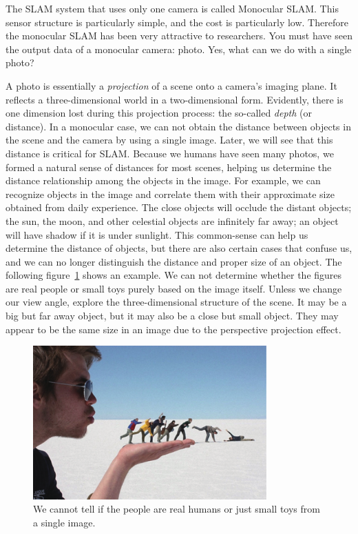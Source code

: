 The SLAM system that uses only one camera is called Monocular SLAM. This sensor structure is particularly simple, and the cost is particularly low. Therefore the monocular SLAM has been very attractive to researchers. You must have seen the output data of a monocular camera: photo. Yes, what can we do with a single photo?

A photo is essentially a \textit{projection} of a scene onto a camera's imaging plane. It reflects a three-dimensional world in a two-dimensional form. Evidently, there is one dimension lost during this projection process: the so-called \textit{depth} (or distance). In a monocular case, we can not obtain the distance between objects in the scene and the camera by using a single image. Later, we will see that this distance is critical for SLAM. Because we humans have seen many photos, we formed a natural sense of distances for most scenes, helping us determine the distance relationship among the objects in the image. For example, we can recognize objects in the image and correlate them with their approximate size obtained from daily experience. The close objects will occlude the distant objects; the sun, the moon, and other celestial objects are infinitely far away; an object will have shadow if it is under sunlight. This common-sense can help us determine the distance of objects, but there are also certain cases that confuse us, and we can no longer distinguish the distance and proper size of an object. The following figure~\ref{fig:why-depth} shows an example. We can not determine whether the figures are real people or small toys purely based on the image itself. Unless we change our view angle, explore the three-dimensional structure of the scene. It may be a big but far away object, but it may also be a close but small object. They may appear to be the same size in an image due to the perspective projection effect.

\begin{figure}
	\centering
	\includegraphics[width=0.8\textwidth]{./resources/whatIsSLAM/why-depth.pdf}
	\caption{We cannot tell if the people are real humans or just small toys from a single image.}
	\label{fig:why-depth}
\end{figure}


